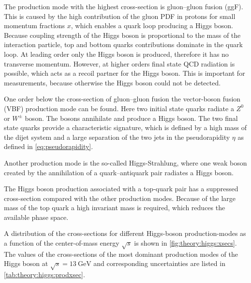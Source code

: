 The production mode with the highest cross-section is gluon--gluon fusion (ggF).
This is caused by the high contribution of the gluon PDF in protons for small momentum fractions $x$, which enables
a quark loop producing a Higgs boson. Because coupling strength of the Higgs boson is proportional to the mass of the
interaction particle, top and bottom quarks contributions dominate in the quark loop.
At leading order only the Higgs boson is produced, therefore it has no transverse momentum.
However, at higher orders final state QCD radiation is possible, which acts as a recoil partner for the Higgs boson.
This is important for measurements, because otherwise the Higgs boson could not be detected.

One order below the cross-section of gluon--gluon fusion the vector-boson fusion (VBF) production mode can be found.
Here two initial state quarks radiate a $Z^0$ or $W^\pm$ boson.
The bosons annihilate and produce a Higgs boson.
The two final state quarks provide a characteristic signature, which is defined by a high mass of the dijet system
and a large separation of the two jets in the pseudorapidity $\eta$ as defined in \cref{eq:pseudorapidity}.

Another production mode is the so-called Higgs-Strahlung, where one weak boson created by the annihilation of
a quark--antiquark pair radiates a Higgs boson.

The Higgs boson production associated with a top-quark pair has a suppressed cross-section compared with the
other production modes.
Because of the large mass of the top quark a high invariant mass is required, which reduces the available phase space.

A distribution of the cross-sections for different Higgs-boson production-modes as a function of the center-of-mass
energy $\sqrt{s}$ is shown in \cref{fig:theory:higgs:xsecs}.
The values of the cross-sections of the most dominant production modes of the Higgs boson at $\sqrt{s} = \SI{13}{\GeV}$
and corresponding uncertainties are listed in \cref{tab:theory:higgs:prodxsec}.

